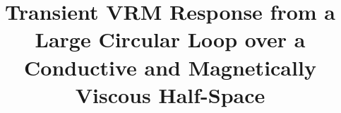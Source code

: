 \documentclass[journal]{IEEEtran}  %
\begin{document}
%
\title{Transient VRM Response from a Large Circular Loop over a Conductive and Magnetically Viscous Half-Space}






\maketitle

\end{document}

